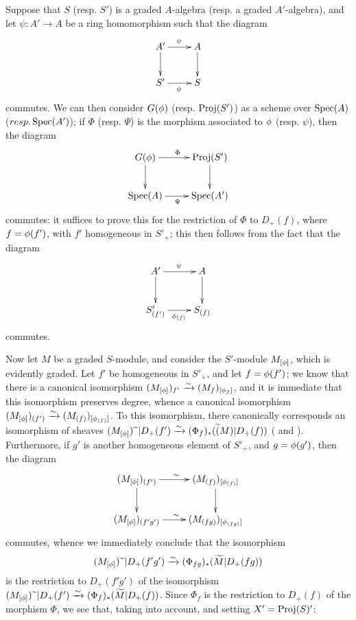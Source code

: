 \begin{env}[2.8.5]
\label{II.2.8.5}
Suppose that $S$ (resp. $S'$) is a graded $A$-algebra (resp. a graded $A'$-algebra), and let $\psi:A'\to A$ be a ring homomorphism such that the diagram
\[
  \xymatrix{
    A' \ar[r]^{\psi} \ar[d]
    & A \ar[d]
  \\S' \ar[r]_{\vphi}
    & S
  }
\]
commutes.
We can then consider $G(\phi)$ (resp. $\operatorname{Proj}(S')$) as a scheme over $\operatorname{Spec}(A)$ ($resp. \operatorname{Spec}(A')$);
if $\Phi$ (resp. $\Psi$) is the morphism associated to $\phi$ (resp. $\psi$), then the diagram
\[
  \xymatrix{
    G(\vphi) \ar[r]^{\Phi} \ar[d]
    & \Proj(S') \ar[d]
  \\\Spec(A) \ar[r]_{\Psi}
    & \Spec(A')
  }
\]
commutes: it suffices to prove this for the restriction of $\Phi$ to $D_+(f)$, where $f=\phi(f')$, with $f'$ homogeneous in $S'_+$;
this then follows from the fact that the diagram
\[
  \xymatrix{
    A' \ar[r]^{\psi} \ar[d]
    & A \ar[d]
  \\S'_{(f')} \ar[r]_{\vphi_{(f)}}
    & S_{(f)}
  }
\]
commutes.
\end{env}

\begin{env}[2.8.6]
\label{II.2.8.6}
Now let $M$ be a graded $S$-module, and consider the $S'$-module $M_{[\phi]}$, which is evidently graded.
Let $f'$ be homogeneous in $S'_+$, and let $f=\phi(f')$;
we know  that there is a canonical isomorphism $(M_{[\phi]})_{f'}\xrightarrow{\sim}(M_f)_{[\phi_f]}$, and it is immediate that this isomorphism preserves degree, whence a canonical isomorphism $(M_{[\phi]})_{(f')}\xrightarrow{\sim}(M_{(f)})_{[\phi_{(f)}]}$.
To this isomorphism, there canonically corresponds an isomorphism of sheaves $(M_{[\phi]}){\,\widetilde{\,}\,}|D_+(f')\xrightarrow{\sim}(\Phi_f)_*(\widetilde(M)|D_+(f))$ ( and ).
Furthermore,
if $g'$ is another homogeneous element of $S'_+$, and $g=\phi(g')$, then the diagram
\[
  \xymatrix{
    (M_{[\vphi]})_{(f')} \ar[r]^{\sim} \ar[d]
    & (M_{(f)})_{[\vphi_{(f)}]} \ar[d]
  \\(M_{[\vphi]})_{(f'g')} \ar[r]^{\sim}
    & (M_{(fg)})_{[\vphi_{(fg)}]}
  }
\]
commutes, whence we immediately conclude that the isomorphism
\[
  (M_{[\phi]}){\,\widetilde{\,}\,}|D_+(f'g') \xrightarrow{\sim} (\Phi_{fg})_*(\widetilde{M}|D_+(fg))
\]
is the restriction to $D_+(f'g')$ of the isomorphism $(M_{[\phi]}){\,\widetilde{\,}\,}|D_+(f')\xrightarrow{\sim}(\Phi_f)_*(\widetilde{M}|D_+(f))$.
Since $\Phi_f$ is the restriction to $D_+(f)$ of the morphism $\Phi$, we see that, taking  into account, and setting $X'=\operatorname{Proj}(S)'$:
\end{env}

